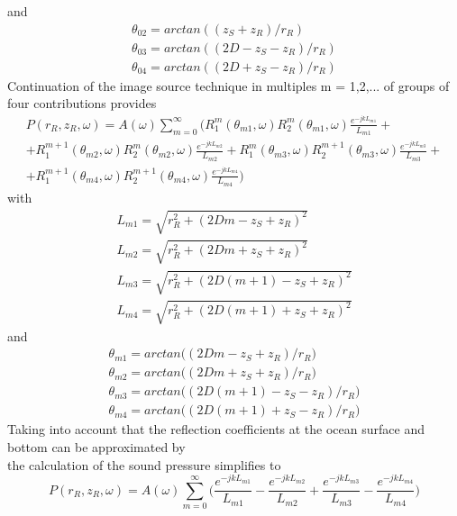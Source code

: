 \noindent and
\begin{equation}
\begin{gathered} 
\theta_{02}  = arctan((z_{S} + z_{R}) / r_{R}) \\
\theta_{03}  = arctan((2D - z_{S} - z_{R}) / r_{R}) \\
\theta_{04}  = arctan((2D + z_{S} - z_{R}) / r_{R})
\end{gathered} 
\end{equation}
\noindent Continuation of the image source technique in multiples m = 1,2,... of groups of four contributions provides
\begin{equation}
\begin{gathered} 
\textit{$P(r_R, z_R,\omega)$} = A(\omega)\sum_{m=0}^{\infty} \Bigg( R_{1}^{m}(\theta_{m1},\omega)  R_{2}^{m}(\theta_{m1},\omega)  \frac{e^{-jkL_{m1}}}{L_{m1}} + \\
 + R_{1}^{m+1}(\theta_{m2},\omega)  R_{2}^{m}(\theta_{m2},\omega)  \frac{e^{-jkL_{m2}}}{L_{m2}} +  R_{1}^{m}(\theta_{m3},\omega)  R_{2}^{m+1}(\theta_{m3},\omega)  \frac{e^{-jkL_{m3}}}{L_{m3}} + \\
 +  R_{1}^{m+1}(\theta_{m4},\omega)  R_{2}^{m+1}(\theta_{m4},\omega)  \frac{e^{-jkL_{m4}}}{L_{m4}} \Bigg)
\end{gathered}
\end{equation}
\noindent with
\begin{equation}
\begin{gathered} 
L_{m1}  = \sqrt{r_{R}^{2} + (2Dm - z_{S} + z_{R})^{2}} \\
L_{m2}  = \sqrt{r_{R}^{2} + (2Dm + z_{S} + z_{R})^{2}} \\
L_{m3}  = \sqrt{r_{R}^{2} + (2D(m+1) - z_{S} + z_{R})^{2}} \\
L_{m4}  = \sqrt{r_{R}^{2} + (2D(m+1) + z_{S} + z_{R})^{2}}
\end{gathered} 
\end{equation}
\noindent and
\begin{equation}
\begin{gathered} 
\theta_{m1}  = arctan \Big((2Dm - z_{S} + z_{R}) / r_{R} \Big) \\
\theta_{m2}  = arctan \Big((2Dm + z_{S} + z_{R}) / r_{R} \Big) \\
\theta_{m3}  = arctan \Big((2D(m+1 ) - z_{S} - z_{R}) / r_{R} \Big) \\
\theta_{m4}  = arctan \Big((2D(m+1 ) +  z_{S} - z_{R}) / r_{R} \Big)
\end{gathered} 
\end{equation}
\noindent Taking into account that the reflection coefficients at the ocean surface and bottom can be approximated by \\
\noindent the calculation of the sound pressure simplifies to
\begin{equation}
\textit{$P(r_R, z_R,\omega)$} = A(\omega)\sum_{m=0}^{\infty} \Bigg(  \frac{e^{-jkL_{m1}}}{L_{m1}} -
\frac{e^{-jkL_{m2}}}{L_{m2}} +  \frac{e^{-jkL_{m3}}}{L_{m3}} - \frac{e^{-jkL_{m4}}}{L_{m4}} \Bigg)
\end{equation}
